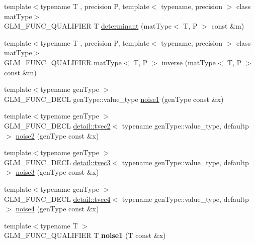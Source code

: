 \begin{DoxyCompactItemize}
\item 
{\footnotesize template$<$typename T , precision P, template$<$ typename, precision $>$ class mat\+Type$>$ }\\G\+L\+M\+\_\+\+F\+U\+N\+C\+\_\+\+Q\+U\+A\+L\+I\+F\+I\+ER T \hyperlink{group__core__func__matrix_ga26ea77c574802bc6fc193c40478718d2}{determinant} (mat\+Type$<$ T, P $>$ const \&m)
\item 
{\footnotesize template$<$typename T , precision P, template$<$ typename, precision $>$ class mat\+Type$>$ }\\G\+L\+M\+\_\+\+F\+U\+N\+C\+\_\+\+Q\+U\+A\+L\+I\+F\+I\+ER mat\+Type$<$ T, P $>$ \hyperlink{group__core__func__matrix_ga7635d3dbe5aa10ff73a0e6903bf6bea5}{inverse} (mat\+Type$<$ T, P $>$ const \&m)
\item 
{\footnotesize template$<$typename gen\+Type $>$ }\\G\+L\+M\+\_\+\+F\+U\+N\+C\+\_\+\+D\+E\+CL gen\+Type\+::value\+\_\+type \hyperlink{group__core__func__noise_gadcbf14e3390990f33fda02bb20836960}{noise1} (gen\+Type const \&x)
\item 
{\footnotesize template$<$typename gen\+Type $>$ }\\G\+L\+M\+\_\+\+F\+U\+N\+C\+\_\+\+D\+E\+CL \hyperlink{structglm_1_1detail_1_1tvec2}{detail\+::tvec2}$<$ typename gen\+Type\+::value\+\_\+type, defaultp $>$ \hyperlink{group__core__func__noise_ga876ad0805cece7b52bac9f5bac42647a}{noise2} (gen\+Type const \&x)
\item 
{\footnotesize template$<$typename gen\+Type $>$ }\\G\+L\+M\+\_\+\+F\+U\+N\+C\+\_\+\+D\+E\+CL \hyperlink{structglm_1_1detail_1_1tvec3}{detail\+::tvec3}$<$ typename gen\+Type\+::value\+\_\+type, defaultp $>$ \hyperlink{group__core__func__noise_gadc066dd8e6c25b77a0dd4f59d4a2dd2c}{noise3} (gen\+Type const \&x)
\item 
{\footnotesize template$<$typename gen\+Type $>$ }\\G\+L\+M\+\_\+\+F\+U\+N\+C\+\_\+\+D\+E\+CL \hyperlink{structglm_1_1detail_1_1tvec4}{detail\+::tvec4}$<$ typename gen\+Type\+::value\+\_\+type, defaultp $>$ \hyperlink{group__core__func__noise_ga4ca7d36395a06c2f210ceca5d9a1d020}{noise4} (gen\+Type const \&x)
\item 
{\footnotesize template$<$typename T $>$ }\\G\+L\+M\+\_\+\+F\+U\+N\+C\+\_\+\+Q\+U\+A\+L\+I\+F\+I\+ER T {\bfseries noise1} (T const \&x)\hypertarget{namespaceglm_a46b13094895146ed855baa444f5b13a2}{}\label{namespaceglm_a46b13094895146ed855baa444f5b13a2}


\end{DoxyCompactItemize}
